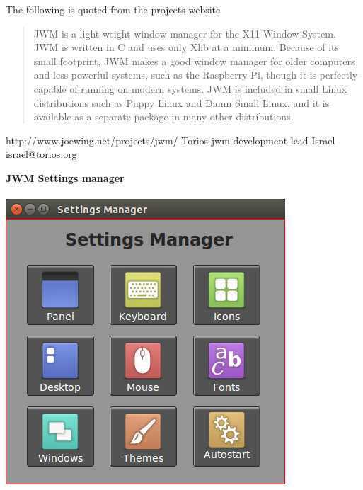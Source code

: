 \documentclass[12pt,a4paper]{book}
\begin{document}
The following is quoted from the projects website

\begin{quote}
JWM is a light-weight window manager for the X11 Window System. JWM is written in C and uses only Xlib at a minimum. Because of its small footprint, JWM makes a good window manager for older computers and less powerful systems, such as the Raspberry Pi, though it is perfectly capable of running on modern systems. JWM is included in small Linux distributions such as Puppy Linux and Damn Small Linux, and it is available as a separate package in many other distributions. 
\end{quote}
http://www.joewing.net/projects/jwm/
Torios jwm development lead Israel israel@torios.org
\newpage

{\large \textbf{JWM Settings manager}} \\ \\
\includegraphics{jwmsettingsmanager}
\\
\\

\end{document}
